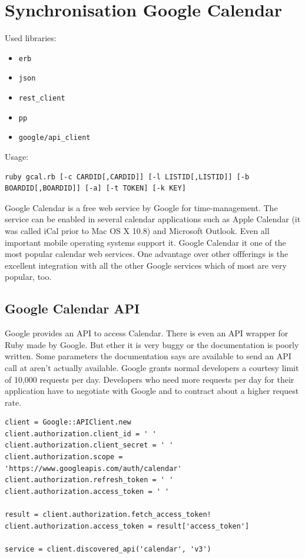 \section{Synchronisation Google Calendar}
Used libraries:
\begin{itemize}
	\item \texttt{erb}
	\item \texttt{json}
	\item \texttt{rest\_client}
	\item \texttt{pp}
	\item \texttt{google/api\_client}
\end{itemize}

Usage:
\begin{lstlisting}[aboveskip=1\baselineskip, style=bash, caption=\texttt{gcal.rb} usage., label=listing025]
ruby gcal.rb [-c CARDID[,CARDID]] [-l LISTID[,LISTID]] [-b BOARDID[,BOARDID]] [-a] [-t TOKEN] [-k KEY]
\end{lstlisting}

Google Calendar is a free web service by Google for time-management. The service can be enabled in several calendar applications such as Apple Calendar (it was called iCal prior to Mac OS X 10.8) and Microsoft Outlook. Even all important mobile operating systems support it. Google Calendar it one of the most popular calendar web services. One advantage over other offferings is the excellent integration with all the other Google services which of most are very popular, too.

\subsection{Google Calendar API}
Google provides an API to access Calendar. There is even an API wrapper for Ruby made by Google. But ether it is very buggy or the documentation is poorly written. Some parameters the documentation says are available to send an API call at aren't actually available. Google grants normal developers a courtesy limit of 10,000 requests per day. Developers who need more requests per day for their application have to negotiate with Google and to contract about a higher request rate.

\begin{lstlisting}[aboveskip=1\baselineskip, caption=Initialisation of the Google Calendar API connection., label=listing017]
client = Google::APIClient.new
client.authorization.client_id = ' '
client.authorization.client_secret = ' '
client.authorization.scope = 'https://www.googleapis.com/auth/calendar'
client.authorization.refresh_token = ' '
client.authorization.access_token = ' '

result = client.authorization.fetch_access_token!
client.authorization.access_token = result['access_token']

service = client.discovered_api('calendar', 'v3')
\end{lstlisting}

